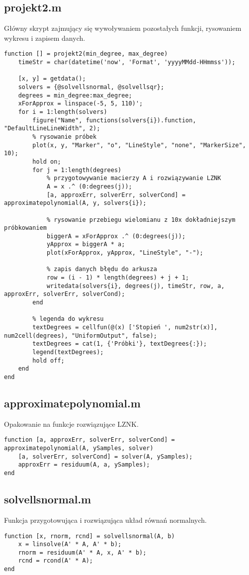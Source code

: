 \documentclass[12pt]{article}
\begin{document}
\subsection{projekt2.m}
Główny skrypt zajmujący się wywoływaniem pozostałych funkcji, rysowaniem wykresu i zapisem danych.
\begin{verbatim}
function [] = projekt2(min_degree, max_degree)
    timeStr = char(datetime('now', 'Format', 'yyyyMMdd-HHmmss'));

    [x, y] = getdata();
    solvers = {@solvellsnormal, @solvellsqr};
    degrees = min_degree:max_degree;
    xForApprox = linspace(-5, 5, 110)';
    for i = 1:length(solvers)
        figure("Name", functions(solvers{i}).function, "DefaultLineLineWidth", 2);
        % rysowanie próbek
        plot(x, y, "Marker", "o", "LineStyle", "none", "MarkerSize", 10);
        hold on;
        for j = 1:length(degrees)
            % przygotowywanie macierzy A i rozwiązywanie LZNK
            A = x .^ (0:degrees(j));
            [a, approxErr, solverErr, solverCond] = approximatepolynomial(A, y, solvers{i});

            % rysowanie przebiegu wielomianu z 10x dokładniejszym próbkowaniem
            biggerA = xForApprox .^ (0:degrees(j));
            yApprox = biggerA * a;
            plot(xForApprox, yApprox, "LineStyle", "-");

            % zapis danych błędu do arkusza
            row = (i - 1) * length(degrees) + j + 1;
            writedata(solvers{i}, degrees(j), timeStr, row, a, approxErr, solverErr, solverCond);
        end

        % legenda do wykresu
        textDegrees = cellfun(@(x) ['Stopień ', num2str(x)], num2cell(degrees), "UniformOutput", false);
        textDegrees = cat(1, {'Próbki'}, textDegrees{:});
        legend(textDegrees);
        hold off;
    end
end
\end{verbatim}

\subsection{approximatepolynomial.m}
Opakowanie na funkcje rozwiązujące LZNK.
\begin{verbatim}
function [a, approxErr, solverErr, solverCond] = approximatepolynomial(A, ySamples, solver)
    [a, solverErr, solverCond] = solver(A, ySamples);
    approxErr = residuum(A, a, ySamples);
end
\end{verbatim}

\subsection{solvellsnormal.m}
Funkcja przygotowująca i rozwiązująca układ równań normalnych.
\begin{verbatim}
function [x, rnorm, rcnd] = solvellsnormal(A, b)
    x = linsolve(A' * A, A' * b);
    rnorm = residuum(A' * A, x, A' * b);
    rcnd = rcond(A' * A);
end
\end{verbatim}
\end{document}
